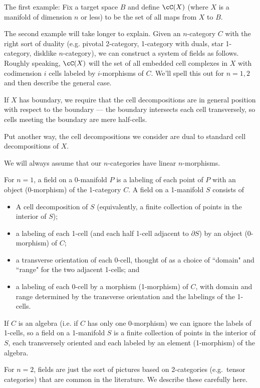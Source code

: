 \documentclass[11pt,leqno]{amsart}
\def\bd{\partial}
\begin{document}
The first example: Fix a target space $B$ and define $\cC(X)$ (where $X$
is a manifold of dimension $n$ or less) to be the set of
all maps from $X$ to $B$.

The second example will take longer to explain.
Given an $n$-category $C$ with the right sort of duality
(e.g. pivotal 2-category, 1-category with duals, star 1-category, disklike $n$-category),
we can construct a system of fields as follows.
Roughly speaking, $\cC(X)$ will the set of all embedded cell complexes in $X$
with codimension $i$ cells labeled by $i$-morphisms of $C$.
We'll spell this out for $n=1,2$ and then describe the general case.

If $X$ has boundary, we require that the cell decompositions are in general
position with respect to the boundary --- the boundary intersects each cell
transversely, so cells meeting the boundary are mere half-cells.

Put another way, the cell decompositions we consider are dual to standard cell
decompositions of $X$.

We will always assume that our $n$-categories have linear $n$-morphisms.

For $n=1$, a field on a 0-manifold $P$ is a labeling of each point of $P$ with
an object (0-morphism) of the 1-category $C$.
A field on a 1-manifold $S$ consists of
\begin{itemize}
    \item A cell decomposition of $S$ (equivalently, a finite collection
of points in the interior of $S$);
    \item a labeling of each 1-cell (and each half 1-cell adjacent to $\bd S$)
by an object (0-morphism) of $C$;
    \item a transverse orientation of each 0-cell, thought of as a choice of
``domain" and ``range" for the two adjacent 1-cells; and
    \item a labeling of each 0-cell by a morphism (1-morphism) of $C$, with
domain and range determined by the transverse orientation and the labelings of the 1-cells.
\end{itemize}

If $C$ is an algebra (i.e. if $C$ has only one 0-morphism) we can ignore the labels
of 1-cells, so a field on a 1-manifold $S$ is a finite collection of points in the
interior of $S$, each transversely oriented and each labeled by an element (1-morphism)
of the algebra.

\medskip

For $n=2$, fields are just the sort of pictures based on 2-categories (e.g.\ tensor categories)
that are common in the literature.
We describe these carefully here.
\end{document}
